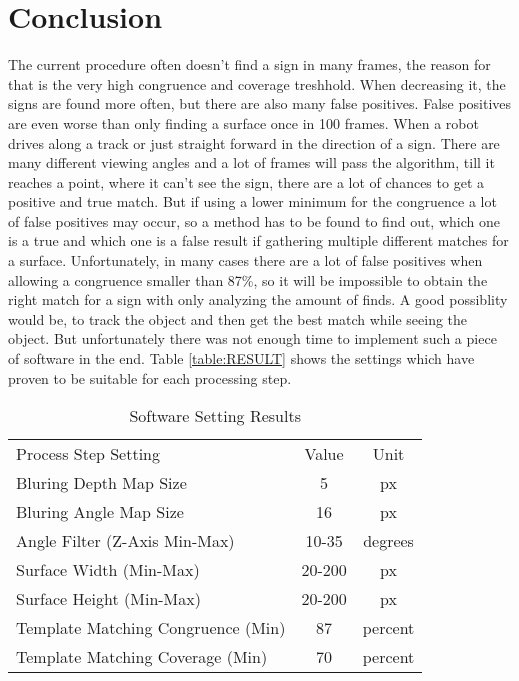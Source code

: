 \chapter{Conclusion}
\graphicspath{{./Conclusion/img/}}

The current procedure often doesn't find a sign in many frames, the reason for that is the very high congruence and coverage
treshhold. When decreasing it, the signs are found more often, but there are also many false positives. False positives are
even worse than only finding a surface once in 100 frames. When a robot drives along a track or just 
straight forward in the direction of a sign. There are many different viewing angles and a lot of frames will pass the algorithm,
till it reaches a point, where it can't see the sign, there are a lot of chances to get a positive and true match. But if
using a lower minimum for the congruence a lot of false positives may occur, so a method has to be found to find out,
which one is a true and which one is a false result if gathering multiple different matches for a surface.
Unfortunately, in many cases there are a lot of false positives when allowing a congruence smaller than 87\%, so 
it will be impossible to obtain the right match for a sign with only analyzing the amount of finds.
A good possiblity would be, to track the object and then get the best match while seeing the object.
But unfortunately there was not enough time to implement such a piece of software in the end. 
Table \vref{table:RESULT} shows the settings which have proven to be suitable for each processing step.

\begin{table}[H]
	\centering
	\begin{tabular}{lcc}
		Process Step Setting 							   & Value                 & Unit \\
		Bluring Depth Map Size							   & 5\footnotemark[1]     & px   \\
		Bluring Angle Map Size							   & 16\footnotemark[1]    & px   \\
		Angle Filter (Z-Axis Min-Max)                      & 10-35                 & degrees \\
		Surface Width (Min-Max)                            & 20-200                & px \\
		Surface Height (Min-Max)                           & 20-200                & px \\
		Template Matching Congruence (Min)                 & 87                    & percent \\
		Template Matching Coverage (Min)                   & 70                    & percent \\
	\end{tabular}
\caption{Software Setting Results}
\label{table:RESULT}
\end{table}

